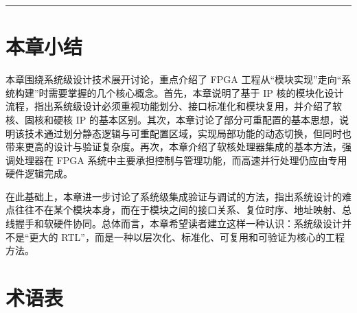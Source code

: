 \begin{center}\rule{0.5\linewidth}{0.5pt}\end{center}

\section{本章小结}\label{ux672cux7ae0ux5c0fux7ed3}

本章围绕系统级设计技术展开讨论，重点介绍了 FPGA
工程从``模块实现''走向``系统构建''时需要掌握的几个核心概念。首先，本章说明了基于
IP
核的模块化设计流程，指出系统级设计必须重视功能划分、接口标准化和模块复用，并介绍了软核、固核和硬核
IP
的基本区别。其次，本章讨论了部分可重配置的基本思想，说明该技术通过划分静态逻辑与可重配置区域，实现局部功能的动态切换，但同时也带来更高的设计与验证复杂度。再次，本章介绍了软核处理器集成的基本方法，强调处理器在
FPGA
系统中主要承担控制与管理功能，而高速并行处理仍应由专用硬件逻辑完成。

在此基础上，本章进一步讨论了系统级集成验证与调试的方法，指出系统设计的难点往往不在某个模块本身，而在于模块之间的接口关系、复位时序、地址映射、总线握手和软硬件协同。总体而言，本章希望读者建立这样一种认识：系统级设计并不是``更大的
RTL''，而是一种以层次化、标准化、可复用和可验证为核心的工程方法。

\section{术语表}\label{ux672fux8bedux8868}

